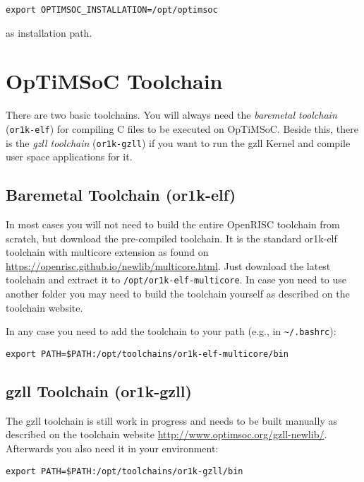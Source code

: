 \begin{lstlisting}
export OPTIMSOC_INSTALLATION=/opt/optimsoc
\end{lstlisting}

as installation path.

\section{OpTiMSoC Toolchain}

There are two basic toolchains. You will always need the
\emph{baremetal toolchain} (\verb|or1k-elf|) for compiling C files to
be executed on OpTiMSoC. Beside this, there is the \emph{gzll
  toolchain} (\verb|or1k-gzll|) if you want to run the gzll Kernel and
compile user space applications for it.

\subsection{Baremetal Toolchain (or1k-elf)}

In most cases you will not need to build the entire OpenRISC toolchain
from scratch, but download the pre-compiled toolchain. It is the
standard or1k-elf toolchain with multicore extension as found on
\url{https://openrisc.github.io/newlib/multicore.html}. Just download
the latest toolchain and extract it to
\verb|/opt/or1k-elf-multicore|. In case you need to use another folder
you may need to build the toolchain yourself as described on the
toolchain website.

In any case you need to add the toolchain to your path (e.g., in
\verb|~/.bashrc|):

\begin{lstlisting}
export PATH=$PATH:/opt/toolchains/or1k-elf-multicore/bin
\end{lstlisting}

\subsection{gzll Toolchain (or1k-gzll)}

The gzll toolchain is still work in progress and needs to be built
manually as described on the toolchain website
\url{http://www.optimsoc.org/gzll-newlib/}. Afterwards you also need
it in your environment:

\begin{lstlisting}
export PATH=$PATH:/opt/toolchains/or1k-gzll/bin
\end{lstlisting}


